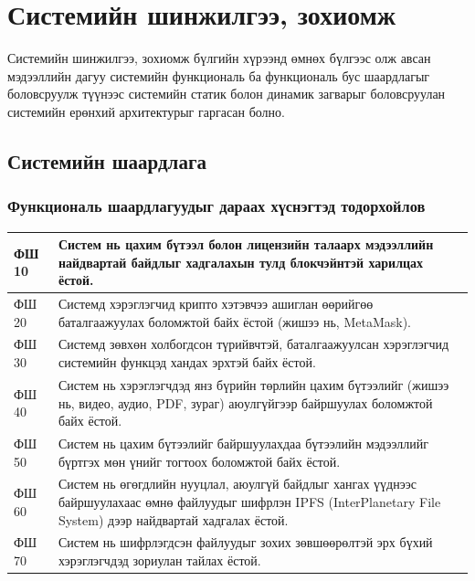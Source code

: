 \chapter{Системийн шинжилгээ, зохиомж}
Системийн шинжилгээ, зохиомж бүлгийн хүрээнд өмнөх бүлгээс олж авсан мэдээллийн дагуу системийн функциональ ба функциональ бус шаардлагыг боловсруулж түүнээс системийн статик болон динамик загварыг боловсруулан системийн ерөнхий архитектурыг гаргасан болно.

\section{Системийн шаардлага}
\subsection{Функциональ шаардлагуудыг дараах хүснэгтэд тодорхойлов}
\begin{table}[h!]
	\centering
   \begin{tabularx}{\textwidth}{|p{}|X|}
		\hline
      ФШ 10 & Систем нь цахим бүтээл болон лицензийн талаарх мэдээллийн найдвартай байдлыг хадгалахын тулд блокчэйнтэй харилцах ёстой.
      \\ \hline ФШ 20 & Системд хэрэглэгчид крипто хэтэвчээ ашиглан өөрийгөө баталгаажуулах боломжтой байх ёстой (жишээ нь, MetaMask).
      \\ \hline ФШ 30 & Системд зөвхөн холбогдсон түрийвчтэй, баталгаажуулсан хэрэглэгчид системийн функцэд хандах эрхтэй байх ёстой.
      \\ \hline ФШ 40 & Систем нь хэрэглэгчдэд янз бүрийн төрлийн цахим бүтээлийг (жишээ нь, видео, аудио, PDF, зураг) аюулгүйгээр байршуулах боломжтой байх ёстой.
      \\ \hline ФШ 50 & Систем нь цахим бүтээлийг байршуулахдаа бүтээлийн мэдээллийг бүртгэх мөн үнийг тогтоох боломжтой байх ёстой.
      \\ \hline ФШ 60 & Систем нь өгөгдлийн нууцлал, аюулгүй байдлыг хангах үүднээс байршуулахаас өмнө файлуудыг шифрлэн IPFS (InterPlanetary File System) дээр найдвартай хадгалах ёстой.
      \\ \hline ФШ 70 & Систем нь шифрлэгдсэн файлуудыг зохих зөвшөөрөлтэй эрх бүхий хэрэглэгчдэд зориулан тайлах ёстой.
      \\ \hline
	\end{tabularx}
\end{table}

